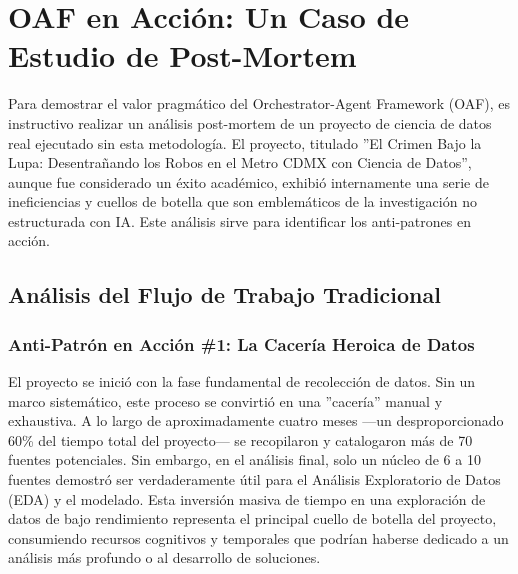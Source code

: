 \documentclass[11pt, a4paper]{article}
\begin{document}
\section{OAF en Acción: Un Caso de Estudio de Post-Mortem}
\label{sec:caso_estudio}

Para demostrar el valor pragmático del Orchestrator-Agent Framework (OAF), es instructivo realizar un análisis post-mortem de un proyecto de ciencia de datos real ejecutado sin esta metodología. El proyecto, titulado ''El Crimen Bajo la Lupa: Desentrañando los Robos en el Metro CDMX con Ciencia de Datos'', aunque fue considerado un éxito académico, exhibió internamente una serie de ineficiencias y cuellos de botella que son emblemáticos de la investigación no estructurada con IA. Este análisis sirve para identificar los anti-patrones en acción.

\subsection{Análisis del Flujo de Trabajo Tradicional}
\label{subsec:flujo_tradicional}

\subsubsection{Anti-Patrón en Acción \#1: La Cacería Heroica de Datos}
El proyecto se inició con la fase fundamental de recolección de datos. Sin un marco sistemático, este proceso se convirtió en una ''cacería'' manual y exhaustiva. A lo largo de aproximadamente cuatro meses —un desproporcionado 60\% del tiempo total del proyecto— se recopilaron y catalogaron más de 70 fuentes potenciales. Sin embargo, en el análisis final, solo un núcleo de 6 a 10 fuentes demostró ser verdaderamente útil para el Análisis Exploratorio de Datos (EDA) y el modelado. Esta inversión masiva de tiempo en una exploración de datos de bajo rendimiento representa el principal cuello de botella del proyecto, consumiendo recursos cognitivos y temporales que podrían haberse dedicado a un análisis más profundo o al desarrollo de soluciones.
\end{document}
